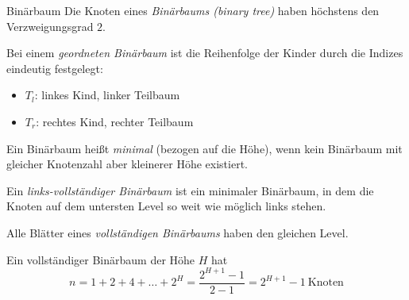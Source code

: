 
\begin{defi}{Binärbaum}
    Die Knoten eines \emph{Binärbaums (binary tree)} haben höchstens den Verzweigungsgrad $2$.

    Bei einem \emph{geordneten Binärbaum} ist die Reihenfolge der Kinder durch die Indizes eindeutig festgelegt:
    \begin{itemize}
        \item $T_l$: linkes Kind, linker Teilbaum
        \item $T_r$: rechtes Kind, rechter Teilbaum
    \end{itemize}

    Ein Binärbaum heißt \emph{minimal} (bezogen auf die Höhe), wenn kein Binärbaum mit gleicher Knotenzahl aber kleinerer Höhe existiert.

    Ein \emph{links-vollständiger Binärbaum} ist ein minimaler Binärbaum, in dem die Knoten auf dem untersten Level so weit wie möglich links stehen.

    Alle Blätter eines \emph{vollständigen Binärbaums} haben den gleichen Level.

    Ein vollständiger Binärbaum der Höhe $H$ hat
    $$
        n = 1 + 2 + 4 + \ldots + 2^H = \frac{2^{H+1}-1}{2-1} = 2^{H+1}-1 \ \text{Knoten}
    $$
\end{defi}

